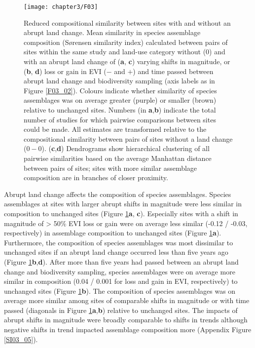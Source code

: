 \begin{figure}[!hb]
\centering
\texttt{[image: chapter3/F03]}
\caption{Reduced compositional similarity between sites with and without an abrupt land change. Mean similarity in species assemblage composition (S\o rensen similarity index) calculated between pairs of sites within the same study and land-use category without ($0$) and with an abrupt land change of (\textbf{a}, \textbf{c}) varying shifts in magnitude, or (\textbf{b}, \textbf{d}) loss or gain in EVI ($-$ and $+$) and time passed between abrupt land change and biodiversity sampling (axis labels as in Figure \ref{F03_02}). Colours indicate whether similarity of species assemblages was on average greater (purple) or smaller (brown) relative to unchanged sites. Numbers (in \textbf{a},\textbf{b}) indicate the total number of studies for which pairwise comparisons between sites could be made. All estimates are transformed relative to the compositional similarity between pairs of sites without a land change ($0 - 0$). (\textbf{c},\textbf{d}) Dendrograms show hierarchical clustering of all pairwise similarities based on the average Manhattan distance between pairs of sites; sites with more similar assemblage composition are in branches of closer proximity. }
\label{F03_03}
\end{figure}

Abrupt land change affects the composition of species assemblages. Species assemblages at sites with larger abrupt shifts in magnitude were less similar in composition to unchanged sites (Figure \ref{F03_03}\textbf{a}, \textbf{c}). Especially sites with a shift in magnitude of > 50\% EVI loss or gain were on average less similar (-0.12 / -0.03, respectively) in assemblage composition to unchanged sites (Figure \ref{F03_03}\textbf{a}). Furthermore, the composition of species assemblages was most dissimilar to unchanged sites if an abrupt land change occurred less than five years ago (Figure \ref{F03_03}\textbf{b},\textbf{d}). After more than five years had passed between an abrupt land change and biodiversity sampling, species assemblages were on average more similar in composition (0.04 / 0.001 for loss and gain in EVI, respectively) to unchanged sites (Figure \ref{F03_03}\textbf{b}). The composition of species assemblages was on average more similar among sites of comparable shifts in magnitude or with time passed (diagonals in Figure \ref{F03_03}\textbf{a},\textbf{b}) relative to unchanged sites. The impacts of abrupt shifts in magnitude were broadly comparable to shifts in trends although negative shifts in trend impacted assemblage composition more (Appendix Figure \ref{SI03_05}).

